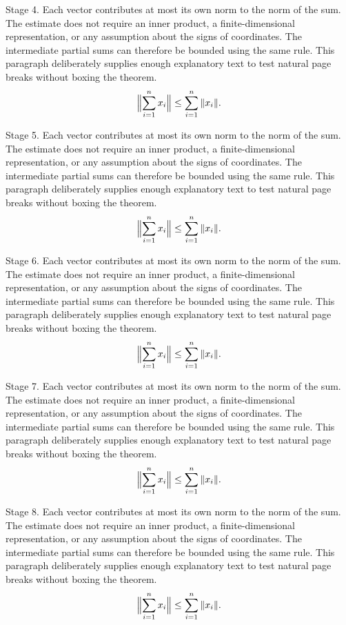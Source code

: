 \begin{pair}[\StatementKeepLines]
\begin{formaltheoremen}{}
\ENIndent Stage 4. Each vector contributes at most its own norm to the norm of the sum. The estimate does not require an inner product, a finite-dimensional representation, or any assumption about the signs of coordinates. The intermediate partial sums can therefore be bounded using the same rule. This paragraph deliberately supplies enough explanatory text to test natural page breaks without boxing the theorem.
\begin{equation*}\Bigl\|\sum_{i=1}^n x_i\Bigr\|\leq\sum_{i=1}^n\|x_i\|.\end{equation*}

\ENIndent Stage 5. Each vector contributes at most its own norm to the norm of the sum. The estimate does not require an inner product, a finite-dimensional representation, or any assumption about the signs of coordinates. The intermediate partial sums can therefore be bounded using the same rule. This paragraph deliberately supplies enough explanatory text to test natural page breaks without boxing the theorem.
\begin{equation*}\Bigl\|\sum_{i=1}^n x_i\Bigr\|\leq\sum_{i=1}^n\|x_i\|.\end{equation*}

\ENIndent Stage 6. Each vector contributes at most its own norm to the norm of the sum. The estimate does not require an inner product, a finite-dimensional representation, or any assumption about the signs of coordinates. The intermediate partial sums can therefore be bounded using the same rule. This paragraph deliberately supplies enough explanatory text to test natural page breaks without boxing the theorem.
\begin{equation*}\Bigl\|\sum_{i=1}^n x_i\Bigr\|\leq\sum_{i=1}^n\|x_i\|.\end{equation*}

\ENIndent Stage 7. Each vector contributes at most its own norm to the norm of the sum. The estimate does not require an inner product, a finite-dimensional representation, or any assumption about the signs of coordinates. The intermediate partial sums can therefore be bounded using the same rule. This paragraph deliberately supplies enough explanatory text to test natural page breaks without boxing the theorem.
\begin{equation*}\Bigl\|\sum_{i=1}^n x_i\Bigr\|\leq\sum_{i=1}^n\|x_i\|.\end{equation*}

\ENIndent Stage 8. Each vector contributes at most its own norm to the norm of the sum. The estimate does not require an inner product, a finite-dimensional representation, or any assumption about the signs of coordinates. The intermediate partial sums can therefore be bounded using the same rule. This paragraph deliberately supplies enough explanatory text to test natural page breaks without boxing the theorem.
\begin{equation*}\Bigl\|\sum_{i=1}^n x_i\Bigr\|\leq\sum_{i=1}^n\|x_i\|.\end{equation*}


\end{formaltheoremen}
\end{pair}
